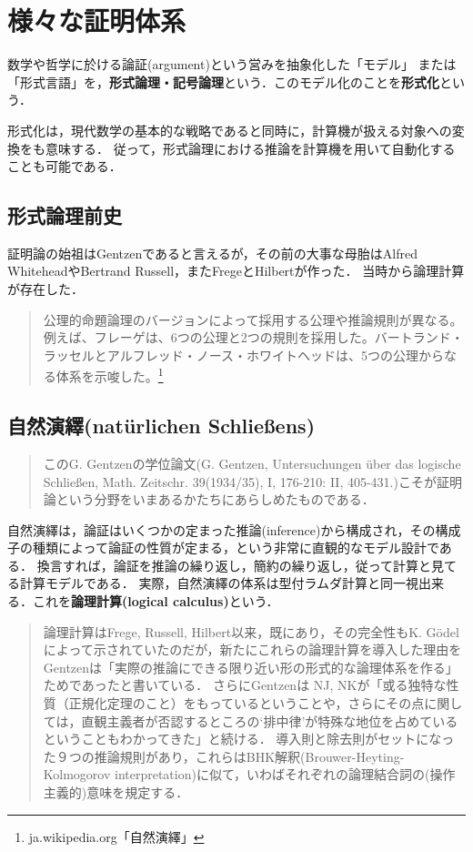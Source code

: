 \documentclass[uplatex, 12pt, dvipdfmx]{jsreport}
\begin{document}
\chapter{様々な証明体系}

\begin{definition}
    数学や哲学に於ける論証(argument)という営みを抽象化した「モデル」
    または「形式言語」を，\textbf{形式論理・記号論理}という．このモデル化のことを\textbf{形式化}という．
\end{definition}
\begin{remark}
    形式化は，現代数学の基本的な戦略であると同時に，計算機が扱える対象への変換をも意味する．
    従って，形式論理における推論を計算機を用いて自動化することも可能である．
\end{remark}

\section{形式論理前史}
証明論の始祖はGentzenであると言えるが，その前の大事な母胎はAlfred WhiteheadやBertrand Russell，またFregeとHilbertが作った．
当時から論理計算が存在した．
\begin{quote}
    公理的命題論理のバージョンによって採用する公理や推論規則が異なる。例えば、フレーゲは、6つの公理と2つの規則を採用した。バートランド・ラッセルとアルフレッド・ノース・ホワイトヘッドは、5つの公理からなる体系を示唆した。\footnote{ja.wikipedia.org「自然演繹」}
\end{quote}

\section{自然演繹(natürlichen Schließens)}
\begin{quote}
    このG. Gentzenの学位論文(G. Gentzen, Untersuchungen über das logische Schließen, Math. Zeitschr. 39(1934/35), I, 176-210: II, 405-431.)こそが証明論という分野をいまあるかたちにあらしめたものである．\cite{新井敏康-Gentzen}
\end{quote}
自然演繹は，論証はいくつかの定まった推論(inference)から構成され，その構成子の種類によって論証の性質が定まる，という非常に直観的なモデル設計である．
換言すれば，論証を推論の繰り返し，簡約の繰り返し，従って計算と見てる計算モデルである．
実際，自然演繹の体系は型付ラムダ計算と同一視出来る．これを\textbf{論理計算(logical calculus)}という．
\begin{quote}
    論理計算はFrege, Russell, Hilbert以来，既にあり，その完全性もK. Gödelによって示されていたのだが，新たにこれらの論理計算を導入した理由をGentzenは「実際の推論にできる限り近い形の形式的な論理体系を作る」ためであったと書いている．
    さらにGentzenは NJ, NKが「或る独特な性質（正規化定理のこと）をもっているということや，さらにその点に関しては，直観主義者が否認するところの‘排中律’が特殊な地位を占めているということもわかってきた」と続ける．
    導入則と除去則がセットになった９つの推論規則があり，これらはBHK解釈(Brouwer-Heyting-Kolmogorov interpretation)に似て，いわばそれぞれの論理結合詞の(操作主義的)意味を規定する．\cite{新井敏康-Gentzen}
\end{quote}
\end{document}
